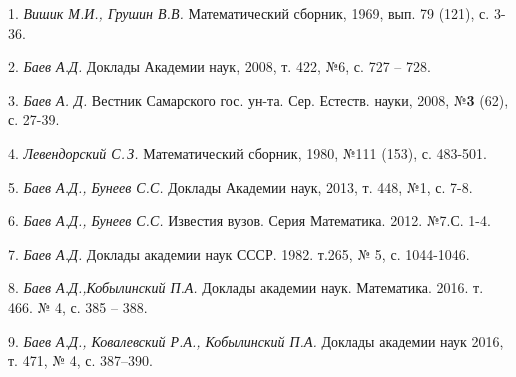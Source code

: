 \litlist

1. {\it Вишик М.И., Грушин В.В.} Математический сборник, 1969, вып. 79 (121), с.
3-36.

2. {\it Баев А.Д.} Доклады Академии наук, 2008, т. 422, №6, с. 727 -- 728.

3. {\it Баев А. Д.} Вестник Самарского гос. ун-та. Сер. Ес\-теств. науки, 2008,
№\textbf{3} (62), с. 27-39.

4. {\it Левендорский С.\,З.} Математический сборник, 1980,
\linebreak
№111 (153), с. 483-501.

5. {\it Баев А.Д., Бунеев С.С.} Доклады Академии наук, 2013, т. 448, №1, с. 7-8.

6. {\it Баев А.Д., Бунеев С.С.} Известия вузов. Серия Математика. 2012. №7.С. 1-4.

7. {\it Баев А.Д.} Доклады академии наук СССР. 1982. т.265, № 5, с. 1044-1046.

8. {\it Баев А.Д.,Кобылинский П.А.} Доклады академии наук. Математика. 2016. т.
466. № 4, с. 385 -- 388.

9. {\it Баев А.Д., Ковалевский Р.А., Кобылинский П.А.} Доклады академии наук 2016,
т. 471, № 4, с. 387--390.






